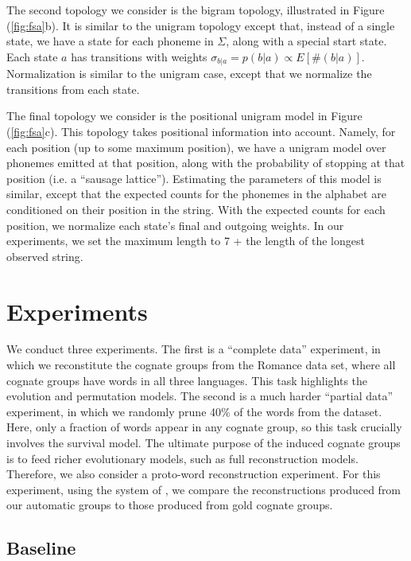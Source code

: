\documentclass[11pt,a4paper]{article}
\begin{document}
The second topology we consider is the bigram topology, illustrated
in Figure (\ref{fig:fsa}b). It is similar to the unigram topology
except that, instead of a single state, we have a state for each
phoneme in $\Sigma$, along with a special start state. Each state
$a$ has transitions with weights $\sigma_{b|a}= p(b|a) \propto
E[\#(b|a)]$. Normalization is similar to the unigram case, except
that we normalize the transitions from each state.

The final topology we consider is the positional unigram model in
Figure (\ref{fig:fsa}c). This topology takes positional information
into account. Namely, for each position (up to some maximum position),
we have a unigram model over phonemes emitted at that position,
along with the probability of stopping at that position (i.e. a
``sausage lattice''). Estimating the parameters of this model is
similar, except that the expected counts for the phonemes in the
alphabet are conditioned on their position in the string. With the
expected counts for each position, we normalize each state's final
and outgoing weights. In our experiments, we set the maximum length
to 7 + the length of the longest observed string.

\section{Experiments}

We conduct three experiments. The first is a ``complete data''
experiment, in which we reconstitute the cognate groups from the
Romance data set, where all cognate groups have words in all three
languages.  This task highlights the evolution and permutation
models.  The second is a much harder ``partial data'' experiment,
in which we randomly prune 40\% of the words from the dataset.
Here, only a fraction of words appear in any cognate group,
so this task crucially involves the survival model.  The ultimate
purpose of the induced cognate groups is to feed richer evolutionary
models, such as full reconstruction models.  Therefore, we also
consider a proto-word reconstruction experiment.  For this experiment,
using the system of , we compare the
reconstructions produced from our automatic groups to those produced
from gold cognate groups.

\subsection{Baseline}
\label{sec:baseline}
\end{document}
